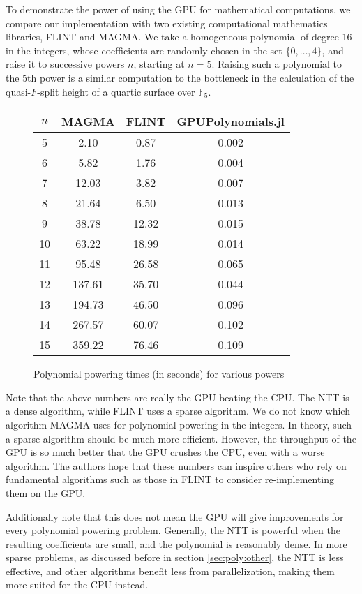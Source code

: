 To demonstrate the power of using the GPU for mathematical computations, 
we compare our implementation
with two existing computational mathematics libraries, FLINT
and MAGMA.
We take a homogeneous polynomial of degree 16 in the integers,
whose coefficients are randomly chosen in the set 
\(\{0, \ldots, 4\}\), and raise it to successive powers \(n\),
starting at \(n=5\).
Raising such a polynomial to the 5th power is a similar 
computation to the bottleneck in the calculation of the
quasi-\(F\)-split height of a quartic surface over \(\mathbb{F}_{5}\).

\begin{figure}[h]
\begin{center}
\begin{tabular}{|c|c|c|c|}
    \hline
    \(n\) & MAGMA & FLINT & GPUPolynomials.jl \\
    \hline
    5 & 2.10 &    0.87 &  0.002 \\
    \hline                      
    6 & 5.82 &    1.76 &  0.004 \\
    \hline                      
    7 & 12.03 &   3.82 &  0.007 \\
    \hline                      
    8 & 21.64 &   6.50 &  0.013 \\
    \hline                      
    9 & 38.78 &   12.32 & 0.015 \\
    \hline                      
    10 & 63.22 &  18.99 & 0.014 \\
    \hline                      
    11 & 95.48 &  26.58 & 0.065 \\
    \hline                      
    12 & 137.61 & 35.70 & 0.044 \\
    \hline                      
    13 & 194.73 & 46.50 & 0.096 \\
    \hline                          
    14 & 267.57 & 60.07 & 0.102\\
    \hline                          
    15 & 359.22 & 76.46 & 0.109\\
    \hline
\end{tabular}
\caption{Polynomial powering times (in seconds) for various powers}
\end{center}
\end{figure}

Note that the above numbers are really the GPU beating the CPU.
The NTT is a dense algorithm, while FLINT uses a sparse algorithm.
We do not know which algorithm MAGMA uses for polynomial powering
in the integers.
In theory, such a sparse algorithm should
be much more efficient.
However, the throughput of the GPU is so much better that the
GPU crushes the CPU, even with a worse algorithm.
The authors hope that these numbers can inspire others who
rely on fundamental algorithms such as those in FLINT to 
consider re-implementing them on the GPU.

Additionally note that this does not mean the GPU will give 
improvements for every polynomial powering 
problem. Generally, the NTT is powerful when the resulting 
coefficients are small, and the polynomial is reasonably dense. 
In more sparse problems, as discussed before in section \ref{sec:poly:other}, 
the NTT is less effective, and other algorithms benefit less 
from parallelization, making them more 
suited for the CPU instead.
